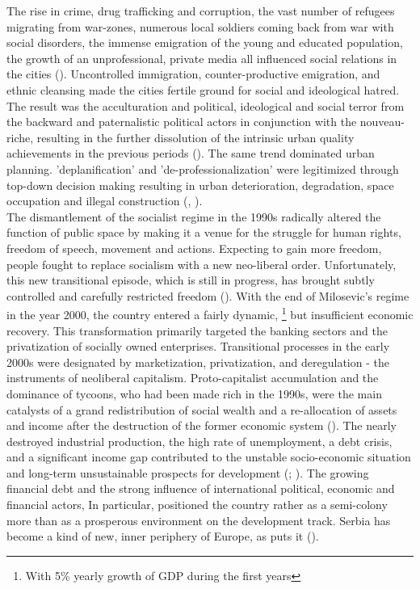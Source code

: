 \documentclass[11pt]{report}
\begin{document}
The rise in crime, drug trafficking and corruption, the vast number of refugees migrating from war-zones, numerous local soldiers coming back from war with social disorders, the immense emigration of the young and educated population, the growth of an unprofessional, private media all influenced social relations in the cities (\href{Doytchinov}{\citealt{doytchinov_urban_2015}}).
Uncontrolled immigration, counter-productive emigration, and ethnic cleansing made the cities fertile ground for social and ideological hatred. The result was the acculturation and political, ideological and social terror from the backward and paternalistic political actors in conjunction with the nouveau-riche, resulting in the further dissolution of the intrinsic urban quality achievements in the previous periods (\href{Doytchinov}{\citealt{doytchinov_belgrade_2015}}).
The same trend dominated urban planning. ’deplanification’ and ’de-professionalization’ were legitimized through top-down decision making resulting in urban deterioration, degradation, space occupation and illegal construction (\href{Vujovic}{\citealt{vujovic_belgrades_2007}}, \href{Vukmirovic}{\citealt{vukmirovic_city_2013}}).
\\

The dismantlement of the socialist regime in the 1990s radically altered the function of public space by making it a venue for the struggle for human rights, freedom of speech, movement and actions. Expecting to gain more freedom, people fought to replace socialism with a new neo-liberal order. Unfortunately, this new transitional episode, which is still in progress, has brought subtly controlled and carefully restricted freedom
(\href{Cvetinovic}{\citealt{bolay_instrumental_2014}}).
With the end of Milosevic's regime in the year 2000, the country entered a fairly dynamic,
\footnote{With 5\%  yearly growth of GDP during the first years}
but insufficient economic recovery.
This transformation primarily targeted the banking sectors and the privatization of socially owned enterprises. Transitional processes in the early 2000s were designated by marketization, privatization, and deregulation - the instruments of neoliberal capitalism. Proto-capitalist accumulation and the dominance of tycoons, who had been made rich in the 1990s, were the main catalysts of a grand redistribution of social wealth and a re-allocation of assets and income after the destruction of the former economic system (\href{Vujosevic}{\citealt{vujosevic_collapse_2010}}).
The nearly destroyed industrial production, the high rate of unemployment, a debt crisis, and a significant income gap contributed to the unstable socio-economic situation and long-term unsustainable prospects for development (\href{Vujosevic}{\citealt{vujosevic_postsocijalisticka_2010}}; \href{Vujosevic}{\citealt{vujosevic_novi_2012}}).
The growing financial debt and the strong influence of international political, economic and financial actors, In particular, positioned the country rather as a semi-colony more than as a prosperous environment on the development track.  
Serbia has become a kind of new, inner periphery of Europe, as
\href{Göler}{\cite{goeler_south-east_2004}} puts it (\href{Vujosevic}{\citealt{vujosevic_post-socialist_2012}}).
\\ 
    
\end{document}

